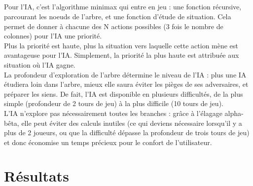 \documentclass{report}
\begin{document}
    \paragraph*{}
    Pour l'IA, c'est l'algorithme minimax qui entre en jeu : une fonction récursive, parcourant les noeuds de l'arbre, et une fonction d'étude de situation. 
    Cela permet de donner à chacune des N actions possibles (3 fois le nombre de colonnes) pour l'IA une priorité. \\
    Plus la priorité est haute, plus la situation vers laquelle cette action mène est avantageuse pour l'IA. Simplement, la priorité la plus haute est attribuée aux situation où 
    l'IA gagne. \\
    La profondeur d'exploration de l'arbre détermine le niveau de l'IA : plus une IA étudiera loin dans l'arbre, mieux elle saura éviter les pièges de ses adversaires, et préparer
    les siens. De fait, l'IA est disponible en plusieurs difficultés, de la plus simple (profondeur de 2 tours de jeu) à la plus difficile (10 tours de jeu). \\
    L'IA n'explore pas nécessairement toutes les branches : grâce à l'élagage alpha-bêta, elle peut éviter des calculs inutiles (ce qui deviens nécessaire lorsqu'il y a plus 
    de 2 joueurs, ou que la difficulté dépasse la profondeur de trois tours de jeu) et donc économise un temps précieux pour le confort de l'utilisateur.


\chapter{Résultats}
    \paragraph*{}
\end{document}
